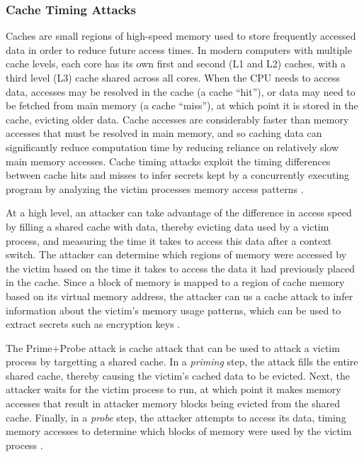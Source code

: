 \subsubsection{Cache Timing Attacks}

Caches are small regions of high-speed memory used to store frequently accessed data in order to reduce future access times. In modern computers with multiple cache levels, each core has its own first and second (L1 and L2) caches, with a third level (L3) cache shared across all cores. When the CPU needs to access data, accesses may be resolved in the cache (a cache ``hit''), or data may need to be fetched from main memory (a cache ``miss''), at which point it is stored in the cache, evicting older data. Cache accesses are considerably faster than memory accesses that must be resolved in main memory, and so caching data can significantly reduce computation time by reducing reliance on relatively slow main memory accesses. Cache timing attacks exploit the timing differences between cache hits and misses to infer secrets kept by a concurrently executing program by analyzing the victim processes memory access patterns \cite{costan_intel_2016, moghimi_cachezoom:_2017}.  

At a high level, an attacker can take advantage of the difference in access speed by filling a shared cache with data, thereby evicting data used by a victim process, and measuring the time it takes to access this data after a context switch. The attacker can determine which regions of memory were accessed by the victim based on the time it takes to access the data it had previously placed in the cache. Since a block of memory is mapped to a region of cache memory based on its virtual memory address, the attacker can us a cache attack to infer information about the victim's memory usage patterns, which can be used to extract secrets such as encryption keys \cite{moghimi_cachezoom:_2017, gotzfried_cache_2017}.

The Prime+Probe attack is cache attack that can be used to attack a victim process by targetting a shared cache. In a \emph{priming} step, the attack fills the entire shared cache, thereby causing the victim's cached data to be evicted. Next, the attacker waits for the victim process to run, at which point it makes memory accesses that result in attacker memory blocks being evicted from the shared cache. Finally, in a \emph{probe} step, the attacker attempts to access its data, timing memory accesses to determine which blocks of memory were used by the victim process \cite{moghimi_cachezoom:_2017, gotzfried_cache_2017}.

